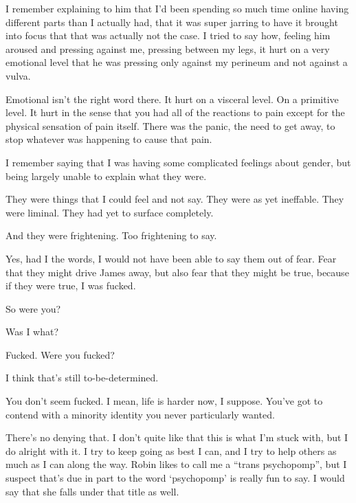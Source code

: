 \begin{paracol}{2}
\begin{leftcolumn}
I remember explaining to him that I'd been spending so much time online having different parts than I actually had, that it was super jarring to have it brought into focus that that was actually not the case. I tried to say how, feeling him aroused and pressing against me, pressing between my legs, it hurt on a very emotional level that he was pressing only against my perineum and not against a vulva.

\begin{ally}
Emotional isn't the right word there. It hurt on a visceral level. On a primitive level. It hurt in the sense that you had all of the reactions to pain except for the physical sensation of pain itself. There was the panic, the need to get away, to stop whatever was happening to cause that pain.
\end{ally}
I remember saying that I was having some complicated feelings about gender, but being largely unable to explain what they were.

They were things that I could feel and not say. They were as yet ineffable. They were liminal. They had yet to surface completely.

\begin{ally}
And they were frightening. Too frightening to say.
\end{ally}
Yes, had I the words, I would not have been able to say them out of fear. Fear that they might drive James away, but also fear that they might be true, because if they were true, I was fucked.
\newpage

\begin{ally}
So were you?
\end{ally}
Was I what?

\begin{ally}
Fucked. Were you fucked?
\end{ally}
I think that's still to-be-determined.

\begin{ally}
You don't seem fucked. I mean, life is harder now, I suppose. You've got to contend with a minority identity you never particularly wanted.
\end{ally}
There's no denying that. I don't quite like that this is what I'm stuck with, but I do alright with it. I try to keep going as best I can, and I try to help others as much as I can along the way. Robin likes to call me a ``trans psychopomp'', but I suspect that's due in part to the word `psychopomp' is really fun to say. I would say that she falls under that title as well.


\end{leftcolumn}
\end{paracol}

